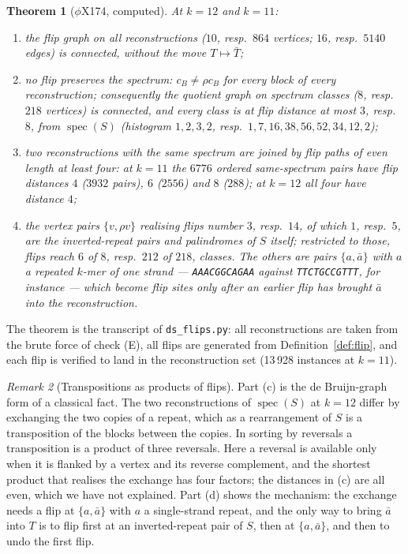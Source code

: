 \documentclass[11pt]{article}
\theoremstyle{plain}
\newtheorem{theorem}{Theorem}
\theoremstyle{definition}
\theoremstyle{remark}
\newtheorem{remark}[theorem]{Remark}
\newcommand{\spec}{\operatorname{spec}}
\begin{document}
\begin{theorem}[$\phi$X174, computed]\label{thm:flips}
At $k=12$ and $k=11$:
\begin{enumerate}
\item[\rm(a)] the flip graph on all reconstructions ($10$, resp.\ $864$ vertices; $16$,
resp.\ $5140$ edges) is connected, without the move $T\mapsto\bar T$;
\item[\rm(b)] no flip preserves the spectrum: $c_B\neq\rho c_B$ for every block of every
reconstruction; consequently the quotient graph on spectrum classes ($8$, resp.\ $218$
vertices) is connected, and every class is at flip distance at most $3$, resp.\ $8$, from
$\spec(S)$ (histogram $1,2,3,2$, resp.\ $1,7,16,38,56,52,34,12,2$);
\item[\rm(c)] two reconstructions with the same spectrum are joined by flip paths of even
length at least four: at $k=11$ the $6776$ ordered same-spectrum pairs have flip distances
$4$ ($3932$ pairs), $6$ ($2556$) and $8$ ($288$); at $k=12$ all four have distance $4$;
\item[\rm(d)] the vertex pairs $\{v,\rho v\}$ realising flips number $3$, resp.\ $14$, of
which $1$, resp.\ $5$, are the inverted-repeat pairs and palindromes of $S$ itself; restricted
to those, flips reach $6$ of $8$, resp.\ $212$ of $218$, classes. The others are pairs
$\{a,\bar a\}$ with $a$ a repeated $k$-mer of one strand --- \texttt{AAACGGCAGAA} against
\texttt{TTCTGCCGTTT}, for instance --- which become flip sites only after an earlier flip has
brought $\bar a$ into the reconstruction.
\end{enumerate}
\end{theorem}

The theorem is the transcript of \texttt{ds\_flips.py}: all reconstructions are taken from the
brute force of check (E), all flips are generated from Definition~\ref{def:flip}, and each
flip is verified to land in the reconstruction set (13\,928 instances at $k=11$).

\begin{remark}[Transpositions as products of flips]
Part (c) is the de Bruijn-graph form of a classical fact. The two reconstructions of
$\spec(S)$ at $k=12$ differ by exchanging the two copies of a repeat, which as a rearrangement
of $S$ is a transposition of the blocks between the copies. In sorting by reversals
\cite{BP96,HP99} a transposition is a product of three reversals. Here a reversal is
available only when it is flanked by a vertex and its reverse complement, and the shortest
product that realises the exchange has four factors; the distances in (c) are all even, which
we have not explained. Part (d) shows the mechanism: the exchange needs a flip at
$\{a,\bar a\}$ with $a$ a single-strand repeat, and the only way to bring $\bar a$ into $T$ is
to flip first at an inverted-repeat pair of $S$, then at $\{a,\bar a\}$, and then to undo the
first flip.
\end{remark}
\end{document}

